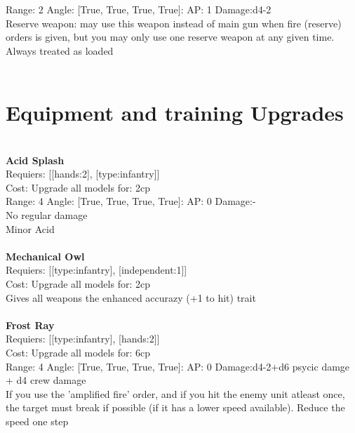 Range: 2  Angle: [True, True, True, True]: AP: 1 Damage:d4-2 \\
Reserve weapon: may use this weapon instead of main gun when fire (reserve) orders is given, but you may only use one reserve weapon at any given time.\\ 
Always treated as loaded\\ 




 
\ \\

\section{Equipment and training Upgrades}\ \\
{\bf Acid Splash } \\

Requiers: [[hands:2], [type:infantry]] \\
Cost: Upgrade all models for: 2cp \\


Range: 4  Angle: [True, True, True, True]: AP: 0 Damage:- \\
No regular damage\\ 
Minor Acid\\ 








\ \\
{\bf Mechanical Owl } \\

Requiers: [[type:infantry], [independent:1]] \\
Cost: Upgrade all models for: 2cp \\
Gives all weapons the enhanced accurazy (+1 to hit) trait\\ 









\ \\
{\bf Frost Ray } \\

Requiers: [[type:infantry], [hands:2]] \\
Cost: Upgrade all models for: 6cp \\


Range: 4  Angle: [True, True, True, True]: AP: 0 Damage:d4-2+d6 psycic damge + d4 crew damage \\
If you use the 'amplified fire' order, and if you hit the enemy unit atleast once, the target must break if possible (if it has a lower speed available). Reduce the speed one step\\ 







